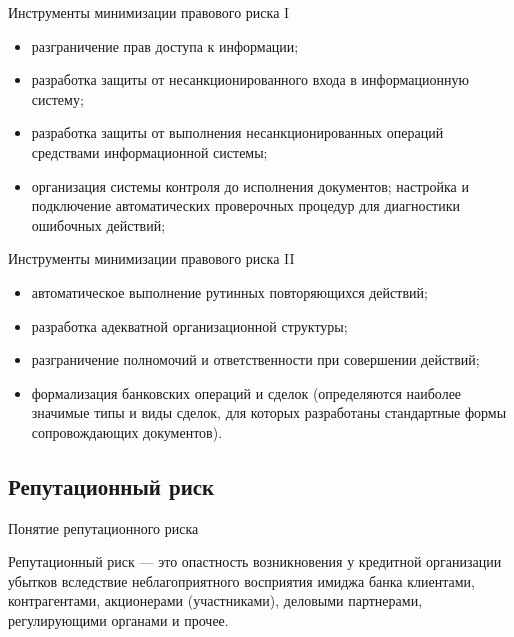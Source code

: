 \documentclass[financial_risks_lectures.tex]{subfiles}
\begin{document}
\begin{frame}{Инструменты минимизации правового риска I}
\begin{itemize}[<+->]
\item
разграничение прав доступа к информации;
\item
разработка защиты от несанкционированного входа в информационную систему;
\item
разработка защиты от выполнения несанкционированных операций средствами информационной системы;
\item
организация системы контроля до исполнения документов;
настройка и подключение автоматических проверочных процедур для диагностики ошибочных действий;
\end{itemize}
\end{frame}

\begin{frame}{Инструменты минимизации правового риска II}
\begin{itemize}[<+->]
\item
автоматическое выполнение рутинных повторяющихся действий;
\item
разработка адекватной организационной структуры;
\item
разграничение полномочий и ответственности при совершении действий;
\item
формализация банковских операций и сделок (определяются наиболее значимые типы и виды сделок, для которых разработаны стандартные формы сопровождающих документов).
\end{itemize}
\end{frame}



\subsection{Репутационный риск}
\begin{frame}{Понятие репутационного риска}
\begin{block}{Репутационный риск}
\quad — это опастность возникновения у кредитной организации убытков вследствие неблагоприятного восприятия имиджа банка клиентами, контрагентами, акционерами (участниками), деловыми партнерами, регулирующими органами и прочее.
\end{block}
\end{frame}
\end{document}
